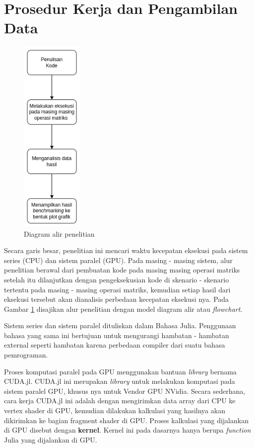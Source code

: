 \section{Prosedur Kerja dan Pengambilan Data}

\begin{figure}[h]
  \centering
  \includegraphics[width=3cm, scale=1]{schema/metode.drawio.png}
  \caption{Diagram alir penelitian}
  \label{img:methods}
\end{figure}

Secara garis besar, penelitian ini mencari waktu kecepatan eksekusi pada sistem
series (CPU) dan sistem paralel (GPU). Pada masing - masing sistem, alur
penelitian berawal dari pembuatan kode pada masing masing operasi matriks
setelah itu dilanjutkan dengan pengeksekusian kode di skenario - skenario
tertentu pada masing - masing operasi matriks, kemudian setiap hasil dari
eksekusi tersebut akan dianalisis perbedaan kecepatan eksekusi nya. Pada Gambar
\ref{img:methods} disajikan alur penelitian dengan model diagram alir atau
\emph{flowchart}.

Sistem series dan sistem paralel dituliskan dalam Bahasa Julia. Penggunaan
bahasa yang sama ini bertujuan untuk mengurangi hambatan - hambatan external
seperti hambatan karena perbedaan compiler dari suatu bahasa pemrograman.

Proses komputasi paralel pada GPU menggunakan bantuan \emph{library} bernama
CUDA.jl. CUDA.jl ini merupakan \emph{library} untuk melakukan komputasi pada
sistem paralel GPU, khusus nya untuk Vendor GPU NVidia. Secara sederhana, cara
kerja CUDA.jl ini adalah dengan mengirimkan data array dari CPU ke vertex
shader di GPU, kemudian dilakukan kalkulasi yang hasilnya akan dikirimkan ke
bagian fragment shader di GPU. Proses kalkulasi yang dijalankan di GPU disebut
dengan \textbf{kernel}. Kernel ini pada dasarnya hanya berupa \emph{function}
Julia yang dijalankan di GPU.

